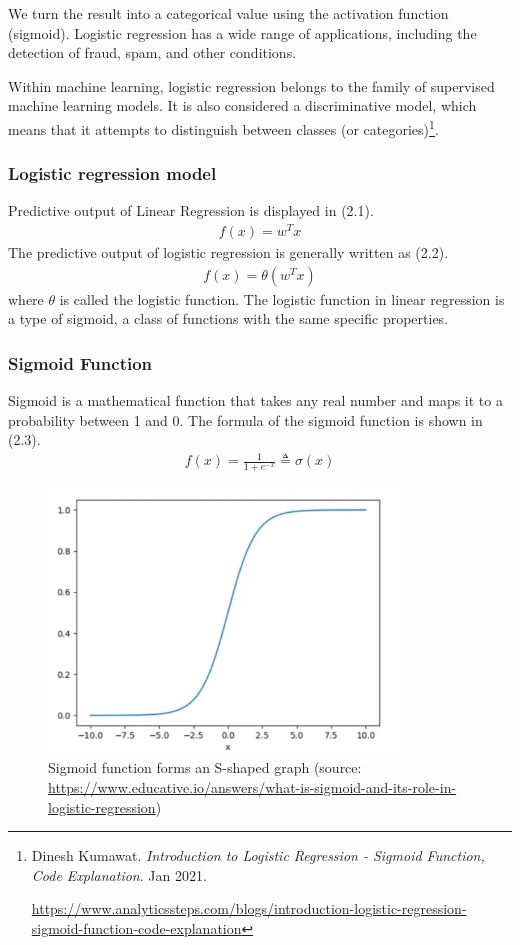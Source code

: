 We turn the result into a categorical value using the activation function (sigmoid). Logistic regression has a wide range of applications, including the detection of fraud, spam, and other conditions.

Within machine learning, logistic regression belongs to the family of supervised machine learning models. It is also considered a discriminative model, which means that it attempts to distinguish between classes (or categories)\footnote{Dinesh Kumawat. \textit{Introduction to Logistic Regression - Sigmoid Function, Code Explanation}. Jan 2021. \raggedright\url{https://www.analyticssteps.com/blogs/introduction-logistic-regression-sigmoid-function-code-explanation}}.
\subsubsection{Logistic regression model}
\hspace{0.5cm}Predictive output of Linear Regression is displayed in (2.1).
\begin{align}
	f(x) = w^T x
\end{align}
\hspace{0.5cm}The predictive output of logistic regression is generally written as (2.2).
\begin{align}
	f(x) = \theta(w^T x)
\end{align}
where $\theta$ is called the logistic function. The logistic function in linear regression is a type of sigmoid, a class of functions with the same specific properties.
\subsubsection{Sigmoid Function}
\hspace{0.5cm}Sigmoid is a mathematical function that takes any real number and maps it to a probability between 1 and 0.
The formula of the sigmoid function is shown in (2.3).
\begin{align}
    f(x) = \frac{1}{1 + e^{-x}} \triangleq \sigma(x)
\end{align}

\begin{figure}[h!]
	\centering
	\includegraphics[width=\linewidth, height=7cm,keepaspectratio]{figures/sigmoid.PNG}
	\caption{Sigmoid function forms an S-shaped graph (source: \url{https://www.educative.io/answers/what-is-sigmoid-and-its-role-in-logistic-regression})}
\end{figure}


